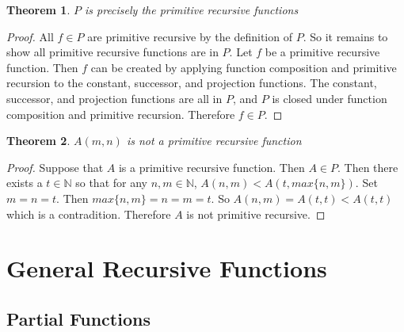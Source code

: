 \documentclass[12pt, letterpaper]{article}
\newtheorem{theorem}{Theorem}
\theoremstyle{case}
\begin{document}
    \begin{theorem}
      $P$ is precisely the primitive recursive functions
    \end{theorem}
    \begin{proof}
      All $f \in P$ are primitive recursive by the definition of $P$.
      So it remains to show all primitive recursive functions are in $P$.
      Let $f$ be a primitive recursive function.
      Then $f$ can be created by applying function composition and primitive recursion to the constant, successor, and
      projection functions. The constant, successor, and projection functions are all in $P$, and $P$ is closed under
      function composition and primitive recursion. Therefore $f \in P$.
    \end{proof}

    \begin{theorem}
      $A(m, n)$ is not a primitive recursive function
    \end{theorem}
    \begin{proof}
      Suppose that $A$ is a primitive recursive function. Then $A \in P$. Then there exists a $t \in \mathbb{N}$
      so that for any $n, m \in \mathbb{N}$, $A(n, m) < A(t, max\{n, m\})$.
      Set $m = n = t$. Then $max\{n, m\} = n = m = t$. So $A(n, m) = A(t, t) < A(t, t)$ which is a contradition.
      Therefore $A$ is not primitive recursive.
    \end{proof}


  \section{General Recursive Functions}
    \subsection{Partial Functions}
\end{document}
